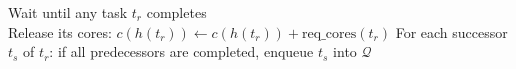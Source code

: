 \begin{algorithm}[H]
{        \BlankLine
        Wait until any task \( t_r \) completes\\
        Release its cores: \( c(h(t_r)) \gets c(h(t_r)) + \text{req\_cores}(t_r) \)
        For each successor \( t_s \) of \( t_r \): if all predecessors are completed, enqueue \( t_s \) into \( \mathcal{Q} \)
    }
\end{algorithm}